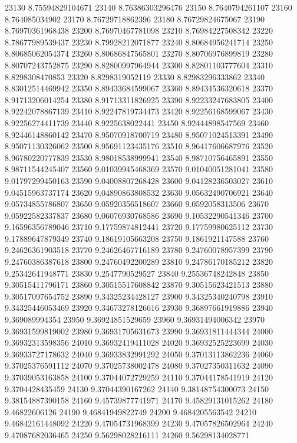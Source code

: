 {23130 8.75594829104671
23140 8.76386303296476
23150 8.7640794261107
23160 8.764085034902
23170 8.76729718862396
23180 8.76729824675067
23190 8.76970361968438
23200 8.76970467781098
23210 8.76984227508342
23220 8.78677989539437
23230 8.79928212071877
23240 8.80684956241714
23250 8.80685062054374
23260 8.80686847565801
23270 8.80706976899819
23280 8.80707243752875
23290 8.82800997964944
23300 8.82801103777604
23310 8.8298308470853
23320 8.8298319052119
23330 8.82983296333862
23340 8.83012514469942
23350 8.89433684599067
23360 8.89434536320618
23370 8.91713206014254
23380 8.91713311826925
23390 8.92233247683805
23400 8.92242078867139
23410 8.92247819734473
23420 8.92256168599067
23430 8.92256274411739
23440 8.9225638022441
23450 8.92444898547569
23460 8.92446148860142
23470 8.95070918700719
23480 8.95071024513391
23490 8.95071130326062
23500 8.95691123435176
23510 8.96417606687976
23520 8.96780220777839
23530 8.98018538999941
23540 8.98710756465891
23550 8.98711544245407
23560 9.01039945468369
23570 9.01040051281041
23580 9.01797299450163
23590 9.04008807268428
23600 9.04128236503027
23610 9.04515963737174
23620 9.04890863808532
23630 9.05632490706921
23640 9.05734855786807
23650 9.05920356518607
23660 9.0592058313506
23670 9.05922582337837
23680 9.06076930768586
23690 9.10532290541346
23700 9.16596356789046
23710 9.17759874812441
23720 9.17759980625112
23730 9.17889647879349
23740 9.18619105663208
23750 9.1861921147588
23760 9.24626361903518
23770 9.24626467716189
23780 9.24760078957399
23790 9.24760386387618
23800 9.24760492200289
23810 9.24786170185212
23820 9.25342641948771
23830 9.2547790529527
23840 9.25536748242848
23850 9.30515411796171
23860 9.30515517608842
23870 9.30515623421513
23880 9.30517097654752
23890 9.34325234428127
23900 9.34325340240798
23910 9.34325446053469
23920 9.34673278126616
23930 9.36897661919886
23940 9.369089994354
23950 9.36924851529659
23960 9.36931494006342
23970 9.36931599819002
23980 9.36931705631673
23990 9.36931811444344
24000 9.36932313598356
24010 9.36932419411028
24020 9.36932525223699
24030 9.36933727178632
24040 9.36933832991292
24050 9.37013113862236
24060 9.37025376591112
24070 9.37025738002478
24080 9.37027350311632
24090 9.37039053163858
24100 9.37044072729259
24110 9.37044178541919
24120 9.3704428435459
24130 9.37044390167262
24140 9.38148754300073
24150 9.38154887390158
24160 9.45739877741971
24170 9.45829131015262
24180 9.46822606126
24190 9.46841949822749
24200 9.4684205563542
24210 9.46842161448092
24220 9.47054731968399
24230 9.47057826502964
24240 9.47087682036465
24250 9.56298028216111
24260 9.56298134028771
}
